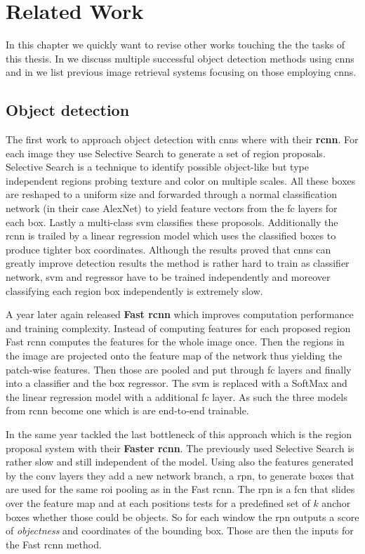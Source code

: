 %
\chapter{Related Work}
\label{sec:related}
In this chapter we quickly want to revise other works touching the the tasks of this thesis. In  we discuss multiple successful object detection methods using \glspl{cnn} and in  we list previous image retrieval systems focusing on those employing \glspl{cnn}.

\section{Object detection}
\label{sec:related:detection}
The first work to approach object detection with \glspl{cnn} where \citet{girshick_rich_2014} with their \textbf{\gls{rcnn}}. For each image they use Selective Search to generate a set of region proposals. Selective Search is a technique to identify possible object-like but type independent regions probing texture and color on multiple scales. All these boxes are reshaped to a uniform size and forwarded through a normal classification network (in their case AlexNet) to yield feature vectors from the \gls{fc} layers for each box. Lastly a multi-class \gls{svm} classifies these proposols. Additionally the \gls{rcnn} is trailed by a linear regression model which uses the classified boxes to produce tighter box coordinates. Although the results proved that \glspl{cnn} can greatly improve detection results the method is rather hard to train as classifier network, \gls{svm} and regressor have to be trained independently and moreover classifying each region box independently is extremely slow.

A year later again \citet{girshick_fast_2015} released \textbf{Fast \gls{rcnn}} which improves computation performance and training complexity. Instead of computing features for each proposed region Fast \gls{rcnn} computes the features for the whole image once. Then the regions in the image are projected onto the feature map of the network thus yielding the patch-wise features. Then those are pooled and put through \gls{fc} layers and finally into a classifier and the box regressor. The \gls{svm} is replaced with a SoftMax and the linear regression model with a additional \gls{fc} layer. As such the three models from \gls{rcnn} become one which is are end-to-end trainable.

In the same year \citet{ren_faster_2015} tackled the last bottleneck of this approach which is the region proposal system with their \textbf{Faster \gls{rcnn}}. The previously used Selective Search is rather slow and still independent of the model. Using also the features generated by the \gls{conv} layers they add a new network branch, a \gls{rpn}, to generate boxes that are used for the same \gls{roi} pooling as in the Fast \gls{rcnn}. The \gls{rpn} is a \gls{fcn} that slides over the feature map and at each positions tests for a predefined set of $k$ anchor boxes whether those could be objects. So for each window the \gls{rpn} outputs a score of \textit{objectness} and coordinates of the bounding box. Those are then the inputs for the Fast \gls{rcnn} method.

